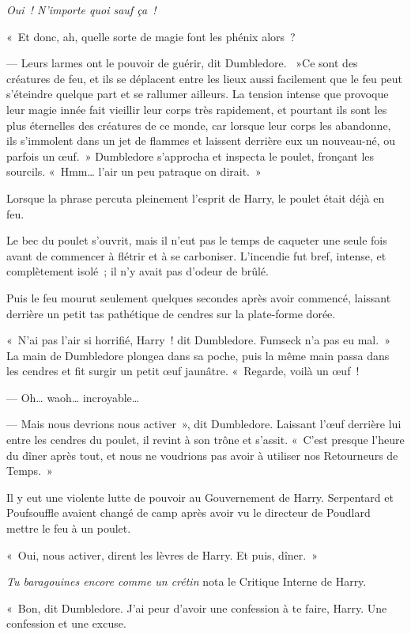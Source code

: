 \emph{Oui~! N'importe quoi sauf ça~!}

«~Et donc, ah, quelle sorte de magie font les phénix alors~?

--- Leurs larmes ont le pouvoir de guérir, dit Dumbledore. ~»Ce sont des créatures de feu, et ils se déplacent entre les lieux aussi facilement que le feu peut s'éteindre quelque part et se rallumer ailleurs. La tension intense que provoque leur magie innée fait vieillir leur corps très rapidement, et pourtant ils sont les plus éternelles des créatures de ce monde, car lorsque leur corps les abandonne, ils s'immolent dans un jet de flammes et laissent derrière eux un nouveau-né, ou parfois un œuf.~» Dumbledore s'approcha et inspecta le poulet, fronçant les sourcils. «~Hmm… l'air un peu patraque on dirait.~»

Lorsque la phrase percuta pleinement l'esprit de Harry, le poulet était déjà en feu.

Le bec du poulet s'ouvrit, mais il n'eut pas le temps de caqueter une seule fois avant de commencer à flétrir et à se carboniser. L'incendie fut bref, intense, et complètement isolé~; il n'y avait pas d'odeur de brûlé.

Puis le feu mourut seulement quelques secondes après avoir commencé, laissant derrière un petit tas pathétique de cendres sur la plate-forme dorée.

«~N'ai pas l'air si horrifié, Harry~! dit Dumbledore. Fumseck n'a pas eu mal.~» La main de Dumbledore plongea dans sa poche, puis la même main passa dans les cendres et fit surgir un petit œuf jaunâtre. «~Regarde, voilà un œuf~!

--- Oh… waoh… incroyable…

--- Mais nous devrions nous activer~», dit Dumbledore. Laissant l'œuf derrière lui entre les cendres du poulet, il revint à son trône et s'assit. «~C'est presque l'heure du dîner après tout, et nous ne voudrions pas avoir à utiliser nos Retourneurs de Temps.~»

Il y eut une violente lutte de pouvoir au Gouvernement de Harry. Serpentard et Poufsouffle avaient changé de camp après avoir vu le directeur de Poudlard mettre le feu à un poulet.

«~Oui, nous activer, dirent les lèvres de Harry. Et puis, dîner.~»

\emph{Tu baragouines encore comme un crétin} nota le Critique Interne de Harry.

«~Bon, dit Dumbledore. J'ai peur d'avoir une confession à te faire, Harry. Une confession et une excuse.

